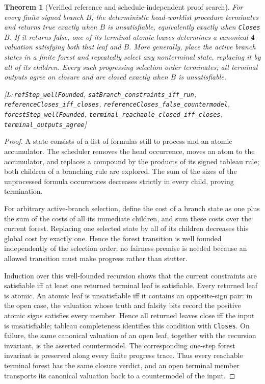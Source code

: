 \documentclass[11pt,a4paper]{article}
\newtheorem{theorem}{Theorem}[section]
\theoremstyle{definition}
\newcommand{\FOUR}{\mathbf{4}}
\newcommand{\lean}[1]{\texttt{#1}}
\newenvironment{leanrefs}
  {\par\smallskip\noindent\begin{minipage}{\linewidth}\small\raggedright}
  {\end{minipage}\par\smallskip}
\begin{document}
\begin{theorem}[Verified reference and schedule-independent proof search]\label{thm:reference-search}
For every finite signed branch $B$, the deterministic head-worklist
procedure terminates and returns true exactly when $B$ is unsatisfiable,
equivalently exactly when \lean{Closes} $B$. If it returns false, one of
its terminal atomic leaves determines a canonical $\FOUR$-valuation
satisfying both that leaf and $B$. More generally, place the active branch
states in a finite forest and repeatedly select any nonterminal state,
replacing it by all of its children. Every such progressing selection
order terminates; all terminal outputs agree on closure and are closed
exactly when $B$ is unsatisfiable.
\begin{leanrefs}
[L:\,\lean{refStep\_wellFounded},
\lean{satBranch\_constraints\_iff\_run},
\lean{referenceCloses\_iff\_closes},
\lean{referenceCloses\_false\_countermodel},
\lean{forestStep\_wellFounded},
\lean{terminal\_reachable\_closed\_iff\_closes},
\lean{terminal\_outputs\_agree}]
\end{leanrefs}
\end{theorem}
\begin{proof}
A state consists of a list of formulas still to process and an atomic
accumulator. The scheduler removes the head occurrence, moves an atom to
the accumulator, and replaces a compound by the products of its signed
tableau rule; both children of a branching rule are explored. The sum of
the sizes of the unprocessed formula occurrences decreases strictly in
every child, proving termination.

For arbitrary active-branch selection, define the cost of a branch state
as one plus the sum of the costs of all its immediate children, and sum
these costs over the current forest. Replacing one selected state by all
of its children decreases this global cost by exactly one. Hence the
forest transition is well founded independently of the selection order;
no fairness premise is needed because an allowed transition must make
progress rather than stutter.

Induction over this well-founded recursion shows that the current
constraints are satisfiable iff at least one returned terminal leaf is
satisfiable. Every returned leaf is atomic. An atomic leaf is
unsatisfiable iff it contains an opposite-sign pair: in the open case, the
valuation whose truth and falsity bits record the positive atomic signs
satisfies every member. Hence all returned leaves close iff the input is
unsatisfiable; tableau completeness identifies this condition with
\lean{Closes}. On failure, the same canonical valuation of an open leaf,
together with the recursion invariant, is the asserted countermodel.
The corresponding one-step forest invariant is preserved along every
finite progress trace. Thus every reachable terminal forest has the same
closure verdict, and an open terminal member transports its canonical
valuation back to a countermodel of the input.
\end{proof}
\end{document}
